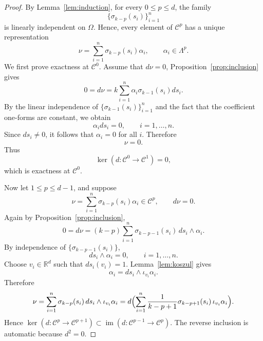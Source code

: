 \documentclass[10pt,a4paper]{amsart}
\begin{document}
\begin{proof}
By Lemma~\ref{lem:induction}, for every $0\le p\le d$, the family
\begin{equation}
\{\sigma_{k-p}(s_i)\}_{i=1}^n
\end{equation}
is linearly independent on $\Omega$. Hence, every element of $\mathcal C^p$ has a unique representation
\begin{equation}
\nu=\sum_{i=1}^n
\sigma_{k-p}(s_i)\alpha_i,
\qquad
\alpha_i\in\Lambda^p.
\end{equation}
We first prove exactness at $\mathcal C^0$. Assume that $ d\nu=0$, Proposition~\ref{prop:inclusion} gives
\begin{equation}
0= d\nu =k\sum_{i=1}^n
\alpha_i\sigma_{k-1}(s_i)d s_i.
\end{equation}
By the linear independence of $\{\sigma_{k-1}(s_i)\}_{i=1}^n$ and the fact that the coefficient one-forms are constant, we obtain
\begin{equation}
\alpha_i d s_i=0,
\qquad i=1,\ldots,n.
\end{equation}
Since $ d s_i\neq0$, it follows that $\alpha_i=0$ for all $i$. Therefore
\begin{equation}
\nu=0.
\end{equation}
Thus
\begin{equation}
\ker( d:\mathcal C^0\to\mathcal C^1)=0,
\end{equation}
which is exactness at $\mathcal C^0$.

Now let $1\le p\le d-1$, and suppose
\begin{equation}
\nu=\sum_{i=1}^n \sigma_{k-p}(s_i)\alpha_i \in \mathcal C ^p,
\qquad d\nu=0.
\end{equation}
Again by Proposition~\ref{prop:inclusion},
\begin{equation}
0=d\nu=(k-p)\sum_{i=1}^n \sigma_{k-p-1}(s_i)\,ds_i\wedge\alpha_i.
\end{equation}
By independence of $\{\sigma_{k-p-1}(s_i)\}$,
\begin{equation}
ds_i\wedge\alpha_i=0,
\qquad i=1,\dots,n.
\end{equation}
Choose $v_i\in\mathbb  R  ^d$ such that $ds_i(v_i)=1$. Lemma~\ref{lem:koszul} gives
\begin{equation}
\alpha_i=ds_i\wedge \iota_{v_i}\alpha_i.
\end{equation}
Therefore
\begin{equation}
\nu
=\sum_{i=1}^n \sigma_{k-p}(s_i)\,ds_i\wedge \iota_{v_i}\alpha_i
=d\Bigl(\sum_{i=1}^n \frac{1}{k-p+1}\sigma_{k-p+1}(s_i)\,\iota_{v_i}\alpha_i\Bigr).
\end{equation}
Hence $\ker(d:\mathcal C ^p\to\mathcal C ^{p+1})\subset \operatorname{im}(d:\mathcal C ^{p-1}\to\mathcal C ^p)$.
The reverse inclusion is automatic because $d^2=0$.


\end{proof}
\end{document}
